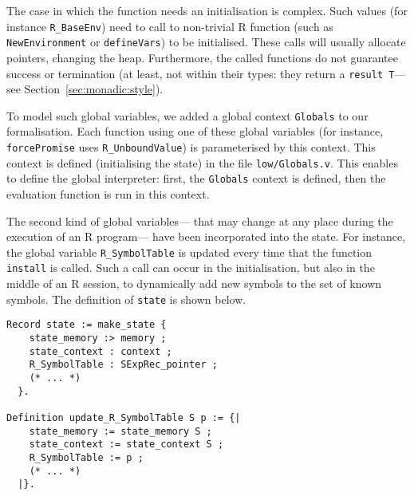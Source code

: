 \documentclass{article}
\newcommand\R{R}
\begin{document}
The case in which the function needs an initialisation is complex.
Such values (for instance \texttt{R_BaseEnv})
need to call to non-trivial \R{} function
(such as \texttt{NewEnvironment} or \texttt{defineVars})
to be initialised.
These calls will usually allocate pointers,
changing the heap.
Furthermore, the called functions do not guarantee success or termination
(at least, not within their types:
they return a \texttt{result T}—%
see Section~\ref{sec:monadic:style}).

To model such global variables,
we added a global context \texttt{Globals} to our formalisation.
Each function using one of these global variables
(for instance, \texttt{forcePromise}
uses \texttt{R_UnboundValue})
is parameterised by this context.
This context is defined
(initialising the state)
in the file \texttt{low/Globals.v}.
This enables to define the global interpreter:
first, the \texttt{Globals} context is defined,
then the evaluation function is run in this context.

The second kind of global variables—%
that may change at any place during the execution of an \R{} program—%
have been incorporated into the state.
For instance, the global variable \texttt{R_SymbolTable}
is updated every time that the function
\texttt{install} is called.
Such a call can occur in the initialisation,
but also in the middle of an \R{} session,
to dynamically add new symbols to the set of known symbols.
The definition of \texttt{state} is shown below.
\begin{verbatim}
Record state := make_state {
    state_memory :> memory ;
    state_context : context ;
    R_SymbolTable : SExpRec_pointer ;
    (* ... *)
  }.

Definition update_R_SymbolTable S p := {|
    state_memory := state_memory S ;
    state_context := state_context S ;
    R_SymbolTable := p ;
    (* ... *)
  |}.
\end{verbatim}
\end{document}
